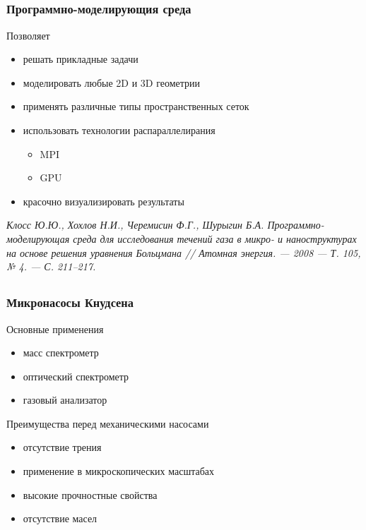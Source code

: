 \documentclass[ucs]{beamer}
\begin{document}
\subsection{}
\begin{frame}
	\frametitle{Программно-моделирующия среда}
	Позволяет
	\begin{itemize}
		\item решать прикладные задачи
		\item моделировать любые 2D и 3D геометрии
		\item применять различные типы пространственных сеток
		\item использовать технологии распараллелирания
		\begin{itemize}
			\item MPI
			\item GPU
		\end{itemize}
		\item красочно визуализировать результаты\newline
	\end{itemize}
	\textit{Клосс Ю.Ю., Хохлов Н.И., Черемисин Ф.Г., Шурыгин Б.А. Программно-моделирующая среда для исследования течений газа в микро- и наноструктурах на основе решения уравнения Больцмана // Атомная энергия. — 2008 — Т. 105, № 4. — С. 211–217.}

\end{frame}

\subsection{}
\begin{frame}
	\frametitle{Микронасосы Кнудсена}
	Основные применения
	\begin{itemize}
		\item масс спектрометр
		\item оптический спектрометр
		\item газовый анализатор\newline
	\end{itemize}
	Преимущества перед механическими насосами
	\begin{itemize}
		\item отсутствие трения
		\item применение в микроскопических масштабах
		\item высокие прочностные свойства
		\item отсутствие масел
	\end{itemize}
\end{frame}
\end{document}
